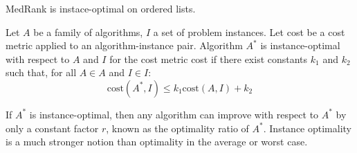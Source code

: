 \begin{property}
    MedRank is instace-optimal on ordered lists.
\end{property}
\begin{theorem}
    Let $A$ be a family of algorithms, $I$ a set of problem instances. 
    Let cost be a cost metric applied to an algorithm-instance pair. 
    Algorithm $A^{*}$ is instance-optimal with respect to $A$ and $I$ for the cost metric cost if there exist constants $k_1$ and $k_2$ such that, for all $A \in A$ and $I \in I$: 
    \[\text{cost}(A^{*}, I) \leq k_1 \text{cost}(A, I) + k_2\]
\end{theorem}

If $A^{*}$ is instance-optimal, then any algorithm can improve with respect to $A^{*}$ by only a constant factor $r$, known as the optimality ratio of $A^{*}$.
Instance optimality is a much stronger notion than optimality in the average or worst case.